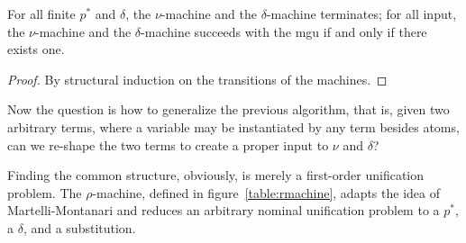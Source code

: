\documentclass[a4paper,UKenglish]{lipics-v2016}
\begin{document}
  \begin{lemma}\label{lemma:numachine}
 For all finite $p^*$ and $\delta$, the $\nu$-machine and the $\delta$-machine terminates;
    for all input, the $\nu$-machine and the $\delta$-machine succeeds with the mgu
    if and only if there exists one.
    \end{lemma}
    \begin{proof}
     By structural induction on the transitions of the machines.
    \end{proof}

    Now the question is how to generalize the previous algorithm, that is,
    given two arbitrary terms, where a variable may be instantiated by any term besides atoms,
    can we re-shape the two terms to create a proper input to $\nu$ and $\delta$?

    Finding the common structure, obviously, is merely a first-order unification problem.
    The $\rho$-machine, defined in figure~\ref{table:rmachine}, adapts the idea of Martelli-Montanari
    and reduces an arbitrary nominal unification problem to a $p^*$, a $\delta$, and a substitution.
\end{document}
